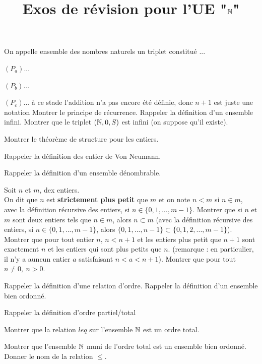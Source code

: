 

\title{Exos de révision pour l'UE "$\mathbb{N}$"}


\maketitle

\be
On appelle ensemble des nombres naturels un triplet constitué ...
\bi
	\item $(P_a)$...
	\item $(P_b)$...
	\item $(P_c)$...
\ei
\bw 
à ce stade l'addition n'a pas encore été définie, donc $n+1$ est juste une notation
\ew
\ee
\be
Montrer le principe de récurrence.
\ee
\be
Rappeler la définition d'un ensemble infini.
\ee
\be
Montrer que le triplet $(\mathbb{N},0,S)$ est infini (on suppose qu'il existe).
\ee

\be[*] 
Montrer le théorème de structure pour les entiers.
\ee

\be
Rappeler la définition des entier de Von Neumann.
\ee

\be
Rappeler la définition d'un ensemble dénombrable.
\ee

\bd
Soit $n$ et $m$, dex entiers.\\
On dit que $n$ est \textbf{strictement plus petit} que $m$ et on note $n < m$ si $n \in m$, \ie avec la définition récursive des entiers, si $n \in \{0,1,...,m-1\}$.
\ed
\be
Montrer que si $n$ et $m$ sont deux entiers tels que $n \in m$, alors $n \subset m$ (\ie avec la définition récursive des entiers, si $n \in \{0,1,...,m-1\}$, alors $\{0,1,...,n-1\} \subset \{0,1,2,...,m-1\}$).
\ee
\be
Montrer que pour tout entier $n$, $n<n+1$ et les entiers plus petit que $n+1$ sont exactement $n$ et les entiers qui sont plus petits que $n$. (remarque : en particulier, il n'y a auncun entier $a$ satisfaisant $n < a < n+1$).
\ee
\be 
Montrer que pour tout $n \ne 0, ~ n > 0$.
\ee

\be
Rappeler la définition d'une relation d'ordre. 
\ee
\be
Rappeler la définition d'un ensemble bien ordonné.
\ee

\be
Rappeler la définition d'ordre partiel/total
\ee

\be
Montrer que la relation $leq$ sur l'ensemble $\mathbb{N}$ est un ordre total.
\ee

\be
Montrer que l'ensemble $\mathbb{N}$ muni de l'ordre total est un ensemble bien ordonné.\\
Donner le nom de la relation $\leq$.
\ee
\


